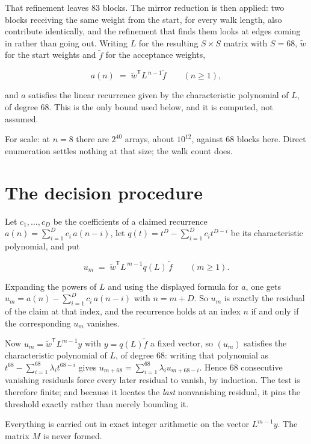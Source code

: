 \documentclass[11pt]{article}
\theoremstyle{definition}
\begin{document}
That refinement leaves $83$ blocks. The mirror reduction is then applied: two blocks receiving the same weight from the start, for every walk length, also contribute identically, and the refinement that finds them looks at edges coming in rather than going out. Writing $L$ for the resulting $S \times S$ matrix with $S = 68$, $\tilde w$ for the start weights and $\tilde f$ for the acceptance weights,

\[a(n) \;=\; \tilde w^{\mathsf T} L^{\,n-1} \tilde f \qquad (n \ge 1),\]

and $a$ satisfies the linear recurrence given by the characteristic polynomial of $L$, of degree $68$. This is the only bound used below, and it is computed, not assumed.

For scale: at $n = 8$ there are $2^{40}$ arrays, about $10^{12}$, against $68$ blocks here. Direct enumeration settles nothing at that size; the walk count does.

\section{The decision procedure}

Let $c_1,\dots,c_D$ be the coefficients of a claimed recurrence $a(n) = \sum_{i=1}^{D} c_i\,a(n-i)$, let $q(t) = t^{D} - \sum_{i=1}^{D} c_i t^{D-i}$ be its characteristic polynomial, and put

\[u_m \;=\; \tilde w^{\mathsf T} L^{\,m-1} q(L)\,\tilde f \qquad (m \ge 1).\]

Expanding the powers of $L$ and using the displayed formula for $a$, one gets $u_m = a(n) - \sum_{i=1}^{D} c_i\,a(n-i)$ with $n = m + D$. So $u_m$ is exactly the residual of the claim at that index, and the recurrence holds at an index $n$ if and only if the corresponding $u_m$ vanishes.

Now $u_m = \tilde w^{\mathsf T} L^{m-1} y$ with $y = q(L)\tilde f$ a fixed vector, so $(u_m)$ satisfies the characteristic polynomial of $L$, of degree $68$: writing that polynomial as $t^{68} - \sum_{i=1}^{68} \lambda_i t^{68-i}$ gives $u_{m+68} = \sum_{i=1}^{68} \lambda_i u_{m+68-i}$. Hence $68$ consecutive vanishing residuals force every later residual to vanish, by induction. The test is therefore finite; and because it locates the {\itshape last} nonvanishing residual, it pins the threshold exactly rather than merely bounding it.

Everything is carried out in exact integer arithmetic on the vector $L^{m-1}y$. The matrix $M$ is never formed.
\end{document}
